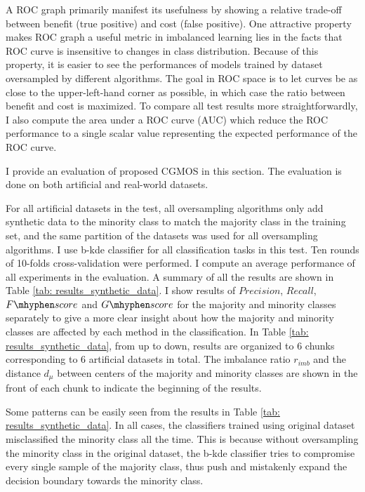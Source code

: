 \documentclass{iitthesis}
\newcommand\fscore{\mathop{F\mhyphen score}}
\newcommand\gscore{\mathop{G\mhyphen score}}
\begin{document}
A ROC graph primarily manifest its usefulness by showing a relative trade-off between benefit (true positive) and cost (false positive). One attractive property makes ROC graph a useful metric in imbalanced learning lies in the facts that ROC curve is insensitive to changes in class distribution. Because of this property, it is easier to see the performances of models trained by dataset oversampled by different algorithms. The goal in ROC space is to let curves be as close to the upper-left-hand corner as possible, in which case the ratio between benefit and cost is maximized. To compare all test results more straightforwardly, I also compute the area under a ROC curve (AUC) which reduce the ROC performance to a single scalar value representing the expected performance of the ROC curve.
 

I provide an evaluation of proposed CGMOS in this section. The evaluation is done on both artificial and real-world datasets.

For all artificial datasets in the test, all oversampling algorithms only add synthetic data to the minority class to match the majority class in the training set, and the same partition of the datasets was used for all oversampling algorithms. I use b-kde classifier for all classification tasks in this test. Ten rounds of 10-folds cross-validation were performed. I compute an average performance of all experiments in the evaluation. A summary of all the results are shown in Table \ref{tab: results_synthetic_data}. I show results of $Precision$, $Recall$, $\fscore$ and $\gscore$ for the majority and minority classes separately to give a more clear insight about how the majority and minority classes are affected by each method in the classification. In Table \ref{tab: results_synthetic_data}, from up to down, results are organized to 6 chunks corresponding to 6 artificial datasets in total. The imbalance ratio $r_{imb}$ and the distance $d_{\mu}$ between centers of the majority and minority classes are shown in the front of each chunk to indicate the beginning of the results.

Some patterns can be easily seen from the results in Table \ref{tab: results_synthetic_data}. In all cases, the classifiers trained using original dataset misclassified the minority class all the time. This is because without oversampling the minority class in the original dataset, the b-kde classifier tries to compromise every single sample of the majority class, thus push and mistakenly expand the decision boundary towards the minority class.
\end{document}
